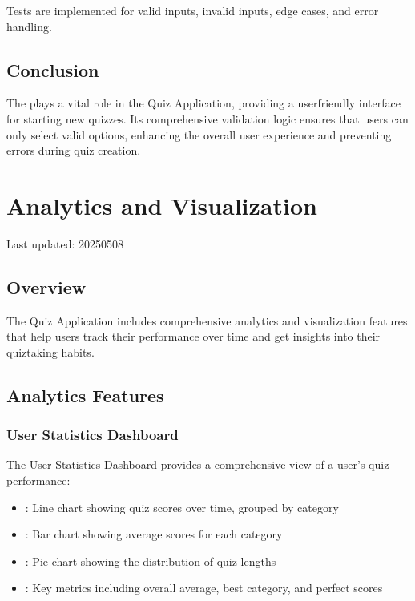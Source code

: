 \documentclass[letterpaper,10pt,english]{sphinxmanual}
\begin{document}
\sphinxAtStartPar
Tests are implemented for valid inputs, invalid inputs, edge cases, and error handling.


\subsection{Conclusion}
\label{\detokenize{forms:conclusion}}
\sphinxAtStartPar
The  plays a vital role in the Quiz Application, providing a user\sphinxhyphen{}friendly interface for starting new quizzes. Its comprehensive validation logic ensures that users can only select valid options, enhancing the overall user experience and preventing errors during quiz creation.

\sphinxstepscope


\section{Analytics and Visualization}
\label{\detokenize{analytics:analytics-and-visualization}}\label{\detokenize{analytics::doc}}
\sphinxAtStartPar
Last updated: 2025\sphinxhyphen{}05\sphinxhyphen{}08


\subsection{Overview}
\label{\detokenize{analytics:overview}}
\sphinxAtStartPar
The Quiz Application includes comprehensive analytics and visualization features that help users
track their performance over time and get insights into their quiz\sphinxhyphen{}taking habits.


\subsection{Analytics Features}
\label{\detokenize{analytics:analytics-features}}

\subsubsection{User Statistics Dashboard}
\label{\detokenize{analytics:user-statistics-dashboard}}
\sphinxAtStartPar
The User Statistics Dashboard provides a comprehensive view of a user’s quiz performance:
\begin{itemize}
\item {} 
\sphinxAtStartPar
{}: Line chart showing quiz scores over time, grouped by category

\item {} 
\sphinxAtStartPar
{}: Bar chart showing average scores for each category

\item {} 
\sphinxAtStartPar
{}: Pie chart showing the distribution of quiz lengths

\item {} 
\sphinxAtStartPar
{}: Key metrics including overall average, best category, and perfect scores

\end{itemize}
\end{document}

